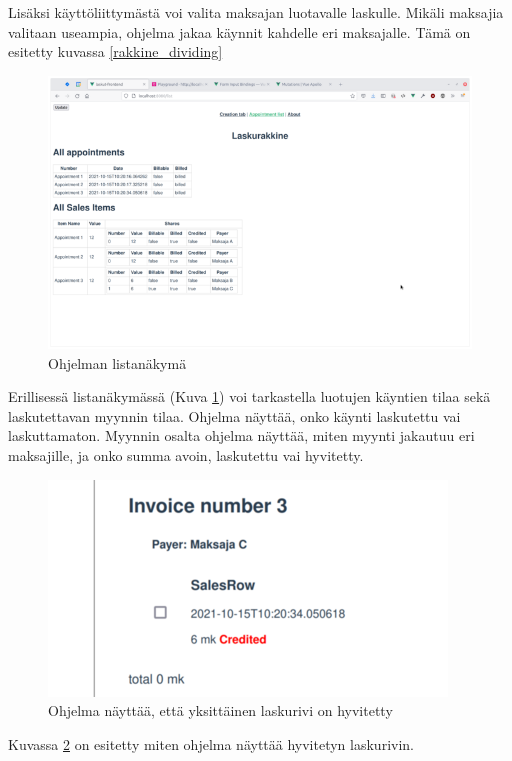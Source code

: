 Lisäksi käyttöliittymästä voi valita maksajan luotavalle laskulle.
Mikäli maksajia valitaan useampia, ohjelma jakaa käynnit kahdelle eri
maksajalle. Tämä on esitetty kuvassa \ref{rakkine_dividing}

\begin{figure}
\centering
\includegraphics{illustration/screenshots/List-view.png}
\caption{\label{rakkine_list-view}Ohjelman listanäkymä}
\end{figure}

Erillisessä listanäkymässä (Kuva \ref{rakkine_list-view}) voi
tarkastella luotujen käyntien tilaa sekä laskutettavan myynnin tilaa.
Ohjelma näyttää, onko käynti laskutettu vai laskuttamaton. Myynnin
osalta ohjelma näyttää, miten myynti jakautuu eri maksajille, ja onko
summa avoin, laskutettu vai hyvitetty.

\begin{figure}
\centering
\includegraphics{illustration/screenshots/credited.png}
\caption{\label{rakkine_credited}Ohjelma näyttää, että yksittäinen
laskurivi on hyvitetty}
\end{figure}

Kuvassa \ref{rakkine_credited} on esitetty miten ohjelma näyttää
hyvitetyn laskurivin.

